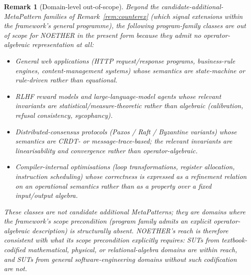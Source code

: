 \documentclass[acmsmall,screen,review]{acmart}
\newtheorem{remark}{Remark}
\begin{document}
\begin{remark}[Domain-level out-of-scope]
\label{rem:domain-out-of-scope}
Beyond the candidate-additional-MetaPattern families of Remark~\ref{rem:counterex} (which signal extensions \emph{within} the framework's general programme), the following program-family classes are out of scope for NOETHER in the present form because they admit no operator-algebraic representation at all:
\begin{itemize}
    \item \emph{General web applications} (HTTP request/response programs, business-rule engines, content-management systems) whose semantics are state-machine or rule-driven rather than equational.
    \item \emph{RLHF reward models and large-language-model agents} whose relevant invariants are statistical/measure-theoretic rather than algebraic (calibration, refusal consistency, sycophancy).
    \item \emph{Distributed-consensus protocols} (Paxos / Raft / Byzantine variants) whose semantics are CRDT- or message-trace-based; the relevant invariants are linearisability and convergence rather than operator-algebraic.
    \item \emph{Compiler-internal optimisations} (loop transformations, register allocation, instruction scheduling) whose correctness is expressed as a refinement relation on an operational semantics rather than as a property over a fixed input/output algebra.
\end{itemize}
These classes are not candidate additional MetaPatterns; they are domains where the framework's scope precondition (program family admits an explicit operator-algebraic description) is structurally absent. NOETHER's reach is therefore consistent with what its scope precondition explicitly requires: SUTs from textbook-codified mathematical, physical, or relational-algebra domains are within reach, and SUTs from general software-engineering domains without such codification are not.
\end{remark}
\end{document}
